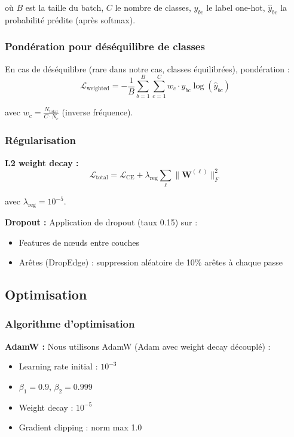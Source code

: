 où $B$ est la taille du batch, $C$ le nombre de classes, $y_{bc}$ le label one-hot, $\hat{y}_{bc}$ la probabilité prédite (après softmax).

\subsubsection{Pondération pour déséquilibre de classes}

En cas de déséquilibre (rare dans notre cas, classes équilibrées), pondération :
\[
\mathcal{L}_{\text{weighted}} = -\frac{1}{B}\sum_{b=1}^B \sum_{c=1}^C w_c \cdot y_{bc} \log(\hat{y}_{bc})
\]

avec $w_c = \frac{N_{\text{total}}}{C \cdot N_c}$ (inverse fréquence).

\subsubsection{Régularisation}

\textbf{L2 weight decay :}
\[
\mathcal{L}_{\text{total}} = \mathcal{L}_{\text{CE}} + \lambda_{\text{reg}} \sum_{\ell} \|\mathbf{W}^{(\ell)}\|_F^2
\]

avec $\lambda_{\text{reg}} = 10^{-5}$.

\textbf{Dropout :}
Application de dropout (taux 0.15) sur :
\begin{itemize}
    \item Features de nœuds entre couches
    \item Arêtes (DropEdge) : suppression aléatoire de 10\% arêtes à chaque passe
\end{itemize}

\subsection{Optimisation}

\subsubsection{Algorithme d'optimisation}

\textbf{AdamW :}
Nous utilisons AdamW (Adam avec weight decay découplé) :
\begin{itemize}
    \item Learning rate initial : $10^{-3}$
    \item $\beta_1 = 0.9$, $\beta_2 = 0.999$
    \item Weight decay : $10^{-5}$
    \item Gradient clipping : norm max 1.0
\end{itemize}

